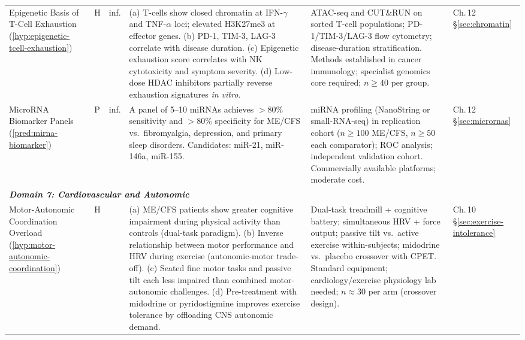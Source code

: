 \begin{longtable}{%
  p{3.0cm}
  >{\centering\arraybackslash}p{0.55cm}
  >{\centering\arraybackslash}p{1.0cm}
  p{3.8cm}
  p{3.8cm}
  p{2.2cm}
}
Epigenetic Basis of T-Cell Exhaustion
(\ref{hyp:epigenetic-tcell-exhaustion})
&
H & inf.
&
(a) T-cells show closed chromatin at IFN-$\gamma$ and TNF-$\alpha$ loci;
elevated H3K27me3 at effector genes.
(b) PD-1, TIM-3, LAG-3 correlate with disease duration.
(c) Epigenetic exhaustion score correlates with NK cytotoxicity and symptom severity.
(d) Low-dose HDAC inhibitors partially reverse exhaustion signatures \textit{in vitro}.
&
ATAC-seq and CUT\&RUN on sorted T-cell populations;
PD-1/TIM-3/LAG-3 flow cytometry;
disease-duration stratification.
Methods established in cancer immunology; specialist genomics core required;
$n \geq 40$ per group.
&
Ch.\,12 \S\ref{sec:chromatin} \\[6pt]

MicroRNA Biomarker Panels
(\ref{pred:mirna-biomarker})
&
P & inf.
&
A panel of 5--10 miRNAs achieves $>$80\% sensitivity and $>$80\% specificity
for ME/CFS vs.\ fibromyalgia, depression, and primary sleep disorders.
Candidates: miR-21, miR-146a, miR-155.
&
miRNA profiling (NanoString or small-RNA-seq) in replication cohort
($n \geq 100$ ME/CFS, $n \geq 50$ each comparator);
ROC analysis; independent validation cohort.
Commercially available platforms; moderate cost.
&
Ch.\,12 \S\ref{sec:micrornas} \\[6pt]

\multicolumn{6}{l}{\small\textit{\textbf{Domain 7: Cardiovascular and Autonomic}}} \\[2pt]

Motor-Autonomic Coordination Overload
(\ref{hyp:motor-autonomic-coordination})
&
H & 0.55
&
(a) ME/CFS patients show greater cognitive impairment during physical activity
than controls (dual-task paradigm).
(b) Inverse relationship between motor performance and HRV during exercise
(autonomic-motor trade-off).
(c) Seated fine motor tasks and passive tilt each less impaired than combined
motor-autonomic challenges.
(d) Pre-treatment with midodrine or pyridostigmine improves exercise tolerance
by offloading CNS autonomic demand.
&
Dual-task treadmill + cognitive battery; simultaneous HRV + force output;
passive tilt vs.\ active exercise within-subjects;
midodrine vs.\ placebo crossover with CPET.
Standard equipment; cardiology/exercise physiology lab needed;
$n \approx 30$ per arm (crossover design).
&
Ch.\,10 \S\ref{sec:exercise-intolerance} \\[6pt]


\end{longtable}
